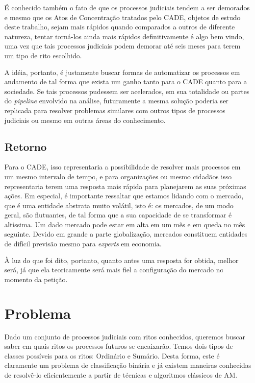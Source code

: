 \documentclass[11pt]{report}
\begin{document}
É conhecido também o fato de que os processos judiciais tendem a ser demorados e mesmo que os Atos de Concentração tratados pelo CADE, objetos de estudo deste
trabalho, sejam mais rápidos quando comparados a outros de diferente natureza, tentar torná-los ainda mais rápidos definitivamente é algo bem vindo, uma vez que
tais processos judiciais podem demorar até seis meses para terem um tipo de rito escolhido.

A idéia, portanto, é justamente buscar formas de automatizar os processos em andamento de tal forma que exista um ganho tanto para o CADE quanto para a sociedade.
Se tais processos pudessem ser acelerados, em sua totalidade ou partes do \textit{pipeline} envolvido na análise, futuramente a mesma solução poderia ser replicada
para resolver problemas similares com outros tipos de processos judiciais ou mesmo em outras áreas do conhecimento.

\subsection{Retorno}

\indent\indent Para o CADE, isso representaria a possibilidade de resolver mais processos em um mesmo intervalo de tempo, e para organizações ou mesmo cidadãos isso representaria
terem uma resposta mais rápida para planejarem as suas próximas ações. Em especial, é importante ressaltar que estamos lidando com o mercado, que é uma
entidade abstrata muito volátil, isto é: os mercados, de um modo geral, são flutuantes, de tal forma que a sua capacidade de se transformar é altíssima.
Um dado mercado pode estar em alta em um mês e em queda no mês seguinte. Devido em grande a parte globalização, mercados constituem entidades de difícil previsão
mesmo para \textit{experts} em economia.

À luz do que foi dito, portanto, quanto antes uma resposta for obtida, melhor será, já que ela teoricamente será mais fiel a configuração do mercado no momento da petição.

\section{Problema}

\indent\indent Dado um conjunto de processos judiciais com ritos conhecidos, queremos buscar saber em quais ritos os processos futuros se encaixarão. Temos dois tipos de classes possíveis para os ritos:
Ordinário e Sumário. Desta forma, este é claramente um problema de classificação binária e já existem maneiras conhecidas de resolvê-lo eficientemente a partir
de técnicas e algoritmos clássicos de AM.
\end{document}
